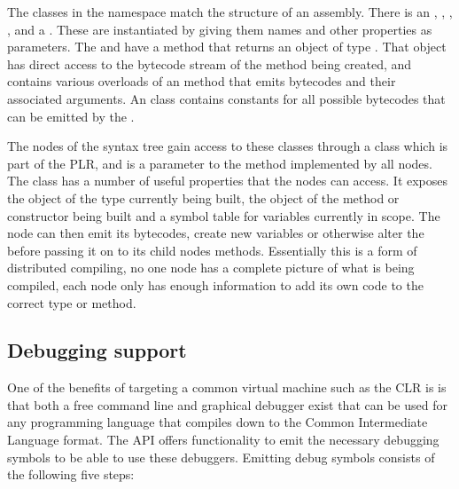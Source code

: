 	The classes in the  namespace match the 
	structure of an assembly. There is an , 
	, , , 
	 and a . These are instantiated 
	by giving them names and other properties as parameters. The 
	 and  have a 
	 method that returns an object of type 
	. That object has direct access to the bytecode stream of 
	the method being created, and contains various overloads of an  
	method that emits bytecodes and their associated arguments. An 
	 class contains constants for all possible bytecodes that can 
	be emitted by the .
	
	The nodes of the syntax tree gain access to these classes through a 
	 class which is part of the PLR, and is a parameter 
	to the  method implemented by all nodes. The 
	 class has a number of useful properties that the 
	nodes can access. It exposes the  object of the type 
	currently being built, the  object of the method or 
	constructor being built and a symbol table for variables currently in scope. 
	The node can then emit its bytecodes, create new variables or otherwise 
	alter the  before passing it on to its child nodes 
	 methods. Essentially this is a form of distributed 
	compiling, no one node has a complete picture of what is being compiled, 
	each node only has enough information to add its own code to the correct 
	type or method.

\subsection{Debugging support}\label{debug_support}
	
	One of the benefits of targeting a common virtual machine such as the CLR is
	is that both a free command line and graphical debugger exist that can be 
	used for any programming language that compiles down to the Common 
	Intermediate Language format. The  API offers 
	functionality to emit the necessary debugging symbols to be able to use 
	these debuggers. Emitting debug symbols consists of the following five steps:
 	
